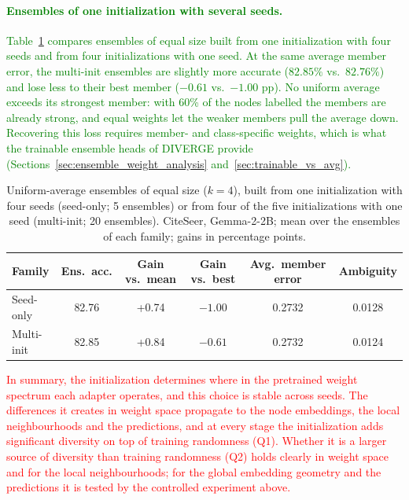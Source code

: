 \documentclass[a4paper,fleqn]{cas-sc}
\newcommand{\revone}[1]{\textcolor{red}{#1}}   %
\newcommand{\revthree}[1]{\textcolor{green}{#1}} %
\begin{document}
\paragraph{\revthree{Ensembles of one initialization with several seeds.}}
\revthree{Table~\ref{tab:seed_multi_ensemble} compares ensembles of equal size built from one initialization with four seeds and from four initializations with one seed. At the same average member error, the multi-init ensembles are slightly more accurate ($82.85\%$ vs.\ $82.76\%$) and lose less to their best member ($-0.61$ vs.\ $-1.00$ pp). No uniform average exceeds its strongest member: with 60\% of the nodes labelled the members are already strong, and equal weights let the weaker members pull the average down. Recovering this loss requires member- and class-specific weights, which is what the trainable ensemble heads of DIVERGE provide (Sections~\ref{sec:ensemble_weight_analysis} and~\ref{sec:trainable_vs_avg}).}

\begin{table}[htbp]
\centering\color{green}
\caption{Uniform-average ensembles of equal size ($k=4$), built from one initialization with four seeds (seed-only; 5 ensembles) or from four of the five initializations with one seed (multi-init; 20 ensembles). CiteSeer, Gemma-2-2B; mean over the ensembles of each family; gains in percentage points.}
\label{tab:seed_multi_ensemble}
\small
\begin{tabular}{lccccc}
\toprule
\textbf{Family} & \textbf{Ens.\ acc.} & \textbf{Gain vs.\ mean} & \textbf{Gain vs.\ best} & \textbf{Avg.\ member error} & \textbf{Ambiguity} \\
\midrule
Seed-only  & 82.76 & +0.74 & $-1.00$ & 0.2732 & 0.0128 \\
Multi-init & 82.85 & +0.84 & $-0.61$ & 0.2732 & 0.0124 \\
\bottomrule
\end{tabular}
\end{table}

\revone{In summary, the initialization determines where in the pretrained weight spectrum each adapter operates, and this choice is stable across seeds. The differences it creates in weight space propagate to the node embeddings, the local neighbourhoods and the predictions, and at every stage the initialization adds significant diversity on top of training randomness (Q1). Whether it is a larger source of diversity than training randomness (Q2) holds clearly in weight space and for the local neighbourhoods; for the global embedding geometry and the predictions it is tested by the controlled experiment above.}
\end{document}
